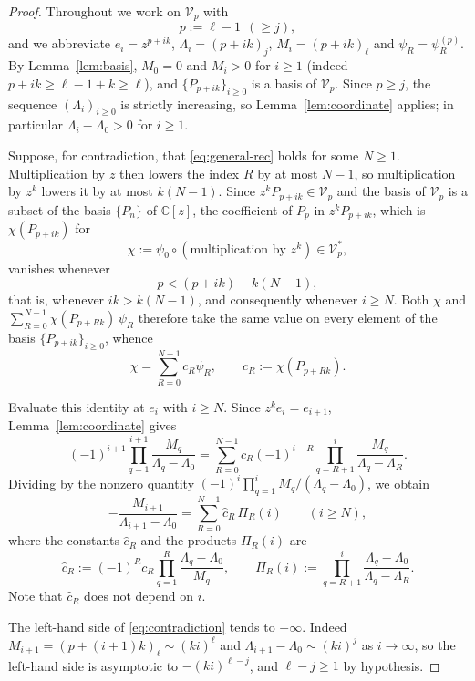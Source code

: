 \documentclass{amsart}
\theoremstyle{definition}
\newcommand{\C}{\mathbb C}
\newcommand{\fall}[2]{(#1)_{#2}}
\begin{document}
\begin{proof}
Throughout we work on \(\mathcal V_p\) with
\[
p:=\ell-1\ \ (\ge j),
\]
and we abbreviate \(e_i=z^{p+ik}\), \(\Lambda_i=\fall{p+ik}{j}\),
\(M_i=\fall{p+ik}{\ell}\) and \(\psi_R=\psi^{(p)}_R\).  By
Lemma~\ref{lem:basis}, \(M_0=0\) and \(M_i>0\) for \(i\ge1\) (indeed
\(p+ik\ge\ell-1+k\ge\ell\)), and \(\{P_{p+ik}\}_{i\ge0}\) is a basis of
\(\mathcal V_p\).  Since \(p\ge j\), the sequence \((\Lambda_i)_{i\ge0}\) is
strictly increasing, so Lemma~\ref{lem:coordinate} applies; in particular
\(\Lambda_i-\Lambda_0>0\) for \(i\ge1\).

Suppose, for contradiction, that \eqref{eq:general-rec} holds for some
\(N\ge1\).  Multiplication by \(z\) then lowers the index \(R\) by at most
\(N-1\), so multiplication by \(z^k\) lowers it by at most \(k(N-1)\).
Since \(z^k P_{p+ik}\in\mathcal V_p\) and the basis of \(\mathcal V_p\) is a
subset of the basis \(\{P_n\}\) of \(\C[z]\), the coefficient of \(P_p\) in
\(z^k P_{p+ik}\), which is \(\chi(P_{p+ik})\) for
\[
\chi:=\psi_0\circ(\text{multiplication by }z^k)\in\mathcal V_p^{*},
\]
vanishes whenever
\[
p<(p+ik)-k(N-1),
\]
that is, whenever \(ik>k(N-1)\), and consequently whenever \(i\ge N\).
Both \(\chi\) and
\(\sum_{R=0}^{N-1}\chi(P_{p+Rk})\,\psi_R\) therefore take the same value on
every element of the basis \(\{P_{p+ik}\}_{i\ge0}\), whence
\[
\chi=\sum_{R=0}^{N-1}c_R\psi_R,
\qquad c_R:=\chi(P_{p+Rk}).
\]

Evaluate this identity at \(e_i\) with \(i\ge N\).  Since \(z^k e_i=e_{i+1}\),
Lemma~\ref{lem:coordinate} gives
\[
(-1)^{i+1}\prod_{q=1}^{i+1}\frac{M_q}{\Lambda_q-\Lambda_0}
=
\sum_{R=0}^{N-1}c_R(-1)^{i-R}
\prod_{q=R+1}^{i}\frac{M_q}{\Lambda_q-\Lambda_R}.
\]
Dividing by the nonzero quantity
\((-1)^i\prod_{q=1}^{i}M_q/(\Lambda_q-\Lambda_0)\), we obtain
\begin{equation}\label{eq:contradiction}
-\frac{M_{i+1}}{\Lambda_{i+1}-\Lambda_0}
=
\sum_{R=0}^{N-1}\widehat c_R\,\Pi_R(i)
\qquad (i\ge N),
\end{equation}
where the constants \(\widehat c_R\) and the products \(\Pi_R(i)\) are
\[
\widehat c_R
:=(-1)^R c_R\prod_{q=1}^{R}\frac{\Lambda_q-\Lambda_0}{M_q},
\qquad
\Pi_R(i):=\prod_{q=R+1}^{i}\frac{\Lambda_q-\Lambda_0}{\Lambda_q-\Lambda_R}.
\]
Note that \(\widehat c_R\) does not depend on \(i\).

The left-hand side of \eqref{eq:contradiction} tends to \(-\infty\).  Indeed
\(M_{i+1}=\fall{p+(i+1)k}{\ell}\sim(ki)^{\ell}\) and
\(\Lambda_{i+1}-\Lambda_0\sim(ki)^{j}\) as \(i\to\infty\), so the left-hand
side is asymptotic to \(-(ki)^{\ell-j}\), and \(\ell-j\ge1\) by hypothesis.


\end{proof}
\end{document}
